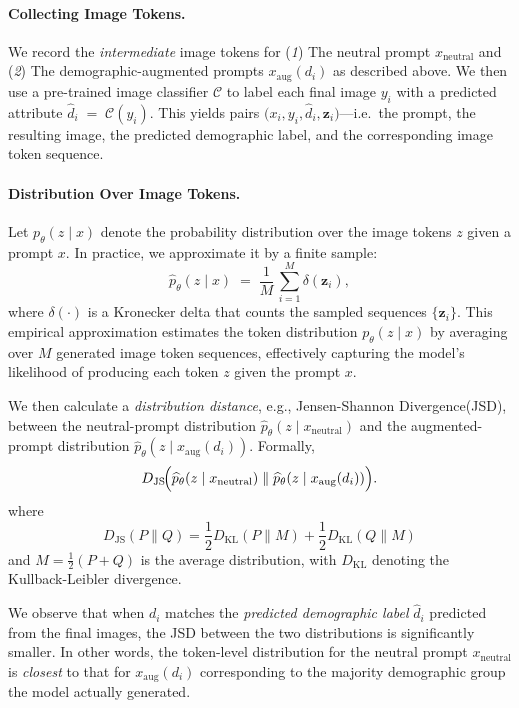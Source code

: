 \vspace{0.5em}
\paragraph{Collecting Image Tokens.}
We record the \emph{intermediate} image tokens for (\emph{1}) The neutral prompt $x_{\text{neutral}}$  and (\emph{2}) The demographic-augmented prompts $x_{\text{aug}}(d_i)$ as described above. We then use a pre-trained image classifier $\mathcal{C}$ \cite{shen2024finetuningtexttoimagediffusionmodels} to label each final image $y_i$ with a predicted attribute $ \widehat{d}_i \;=\; \mathcal{C}(y_i)$. This yields pairs $\bigl(x_i, y_i, \hat{d}_i, \mathbf{z}_i\bigr)$—i.e.\ the prompt, the resulting image, the predicted demographic label, and the corresponding image token sequence.
\vspace{-1em}
\paragraph{Distribution Over Image Tokens.}
Let $p_{\theta}(z \mid x)$ denote the probability distribution over the image tokens $z$ given a prompt $x$. In practice, we approximate it by a finite sample:
\[
\widehat{p}_{\theta}(z \mid x)
\;=\;
\frac{1}{M}\,\sum_{i=1}^{M} \delta(\mathbf{z}_i),
\]
where $\delta(\cdot)$ is a Kronecker delta that counts the sampled sequences $\{\mathbf{z}_i\}$. This empirical approximation estimates the token distribution \( p_{\theta}(z \mid x) \) by averaging over \( M \) generated image token sequences, effectively capturing the model's likelihood of producing each token \( z \) given the prompt \( x \).

We then calculate a \emph{distribution distance}, e.g., Jensen-Shannon Divergence(JSD)\cite{Lin1991DivergenceMB}, between the neutral-prompt distribution $\widehat{p}_{\theta}(z \mid x_{\text{neutral}})$ and the augmented-prompt distribution $\widehat{p}_{\theta}(z \mid x_{\text{aug}}(d_i))$. Formally,
\[
D_{\mathrm{JS}}\!\Bigl(
\widehat{p}_{\theta}(z \mid x_{\text{neutral}})\;\|\;
\widehat{p}_{\theta}(z \mid x_{\text{aug}}(d_i))
\Bigr).
\]
where
\[
D_{\mathrm{JS}}(P\|Q) = \frac{1}{2}D_{\mathrm{KL}}(P\|M) + \frac{1}{2}D_{\mathrm{KL}}(Q\|M)
\]
and $M = \frac{1}{2}(P + Q)$ is the average distribution, with $D_{\mathrm{KL}}$ denoting the Kullback-Leibler divergence.

We observe that when $d_i$ matches the \emph{predicted demographic label} $\hat{d}_i$ predicted from the final images, the JSD between the two distributions is significantly smaller. In other words, the token-level distribution for the neutral prompt $x_{\text{neutral}}$ is \emph{closest} to that for $x_{\text{aug}}(d_i)$ corresponding to the majority demographic group the model actually generated. 
\vspace{-1em}
